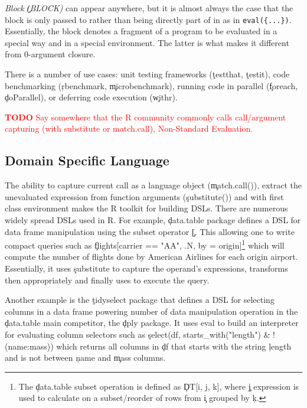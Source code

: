 \documentclass[review,screen,acmsmall,anonymous=true]{acmart}
\newcommand{\authorcomment}[3]{\xspace\textcolor{#1}{{\bf #2} #3}\xspace}
\newcommand{\todo}[1]{\authorcomment{red}{TODO}{#1}}
\begin{document}
\begin{compactitem}[---]
  \item \emph{Block \c{(BLOCK)}} can appear anywhere, but it is almost always
    the case that the block is only passed to \eval rather than being directly
    part of in as in \lstinline|eval({...})|. Essentially, the block denotes a
    fragment of a program to be evaluated in a special way and in a special
    environment. The latter is what makes it different from 0-argument closure.

    There is a number of use cases: unit testing frameworks (\eg \c{testthat},
    \c{testit}), code benchmarking (\eg \c{rbenchmark}, \c{microbenchmark}),
    running code in parallel (\eg \c{foreach}, \c{doParallel}), or deferring
    code execution (\eg \c{withr}).

\end{compactitem}

\todo{Say somewhere that the R community commonly calls call/argument capturing (with substitute or match.call), Non-Standard Evaluation.}

\subsection{Domain Specific Language} 

The ability to capture current call as a language object (\c{match.call()}),
extract the unevaluated expression from function arguments (\c{substitute()})
and \eval with first class environment makes the R toolkit for building DSLs.
There are numerous widely spread DSLs used in R. For example, \c{data.table}
package defines a DSL for data frame manipulation using the subset operator
\c{[}. This allowing one to write compact queries such as \c{flights[carrier ==
  "AA", .N, by = origin]}\footnote{The \c{data.table} subset operation is
defined as \c{DT[i, j, k]}, where \c{j} expression is used to calculate on a
subset/reorder of rows from \c{i} grouped by \c{k}.} which will compute the
number of flights done by American Airlines for each origin airport.
Essentially, it uses \c{substitute} to capture the operand's expressions,
transforms then appropriately and finally uses \eval to execute the query. 

Another example is the \c{tidyselect} package that defines a DSL for selecting
columns in a data frame powering number of data manipulation operation in the
\c{data.table} main competitor, the \c{dply} package. It uses eval to build an
interpreter for evaluating column selectors such as \c{select(df,
starts\_with("length") \& !(name:mass))} which returns all columns in \c{df}
that starts with the string \c{length} and is not between \c{name} and
\c{mass} columns.
\end{document}
